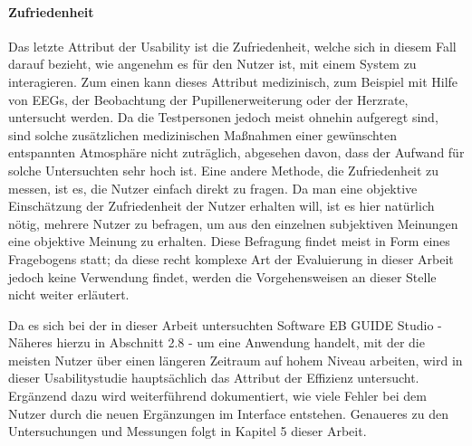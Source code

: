 \paragraph{Zufriedenheit}
Das letzte Attribut der Usability ist die Zufriedenheit, welche sich in diesem Fall darauf bezieht, wie angenehm es für den Nutzer ist, mit einem System zu interagieren.
Zum einen kann dieses Attribut medizinisch, zum Beispiel mit Hilfe von EEGs, der Beobachtung der Pupillenerweiterung oder der Herzrate, untersucht werden.
Da die Testpersonen jedoch meist ohnehin aufgeregt sind, sind solche zusätzlichen medizinischen Maßnahmen einer gewünschten entspannten Atmosphäre nicht zuträglich, abgesehen davon, dass der Aufwand für solche Untersuchten sehr hoch ist.
Eine andere Methode, die Zufriedenheit zu messen, ist es, die Nutzer einfach direkt zu fragen.
Da man eine objektive Einschätzung der Zufriedenheit der Nutzer erhalten will, ist es hier natürlich nötig, mehrere Nutzer zu befragen, um aus den einzelnen subjektiven Meinungen eine objektive Meinung zu erhalten.
Diese Befragung findet meist in Form eines Fragebogens statt; da diese recht komplexe Art der Evaluierung in dieser Arbeit jedoch keine Verwendung findet, werden die Vorgehensweisen an dieser Stelle nicht weiter erläutert.

Da es sich bei der in dieser Arbeit untersuchten Software EB GUIDE Studio - Näheres hierzu in Abschnitt 2.8 - um eine Anwendung handelt, mit der die meisten Nutzer über einen längeren Zeitraum auf hohem Niveau arbeiten, wird in dieser Usabilitystudie hauptsächlich das Attribut der Effizienz untersucht. Ergänzend dazu wird weiterführend dokumentiert, wie viele Fehler bei dem Nutzer durch die neuen Ergänzungen im Interface entstehen. Genaueres zu den Untersuchungen und Messungen folgt in Kapitel 5 dieser Arbeit.


